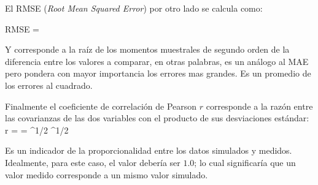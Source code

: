 El RMSE (\emph{Root Mean Squared Error}) por otro lado se calcula como:

\be 
RMSE = 
\ee

Y corresponde a la raíz de los momentos muestrales de segundo orden de la diferencia entre los valores a comparar, en otras palabras, es un análogo al MAE pero pondera con mayor importancia los errores mas grandes. Es un promedio de los errores al cuadrado.

Finalmente el coeficiente de correlación de Pearson $r$ corresponde a la razón entre las covarianzas de las dos variables con el producto de sus desviaciones estándar:
\be 
r =  =  {\left[\sum\limits_{i=1}^n (x_i-\overline{x})^2\right]^{1/2} \left[\sum\limits_{i=1}^n (y_i-\overline{y})^2\right]^{1/2}}
\ee

Es un indicador de la proporcionalidad entre los datos simulados y medidos. Idealmente, para este caso, el valor debería ser $1.0$; lo cual significaría que un valor medido corresponde a un mismo valor simulado.